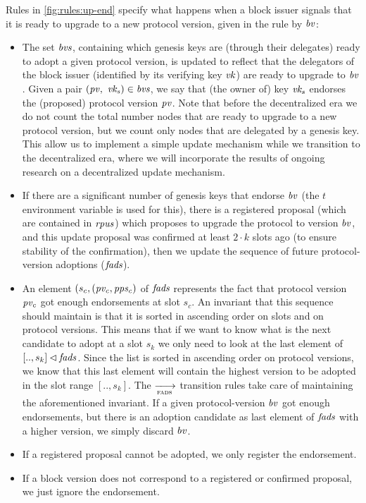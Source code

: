 Rules in \cref{fig:rules:up-end} specify what happens when a block issuer
signals that it is ready to upgrade to a new protocol version, given in the
rule by $\mathit{bv}$:
\begin{itemize}
\item The set $\mathit{bvs}$, containing which genesis keys are (through their
  delegates) ready to adopt a given protocol version, is updated to reflect
  that the delegators of the block issuer (identified by its verifying key
  $\mathit{vk}$) are ready to upgrade to $\mathit{bv}$. Given a pair
  $(\mathit{pv}, ~\mathit{vk_s}) \in \mathit{bvs}$, we say that (the owner of) key
  $\mathit{vk_s}$ endorses the (proposed) protocol version $\mathit{pv}$.
  Note that before the decentralized era we do not count the total number nodes
  that are ready to upgrade to a new protocol version, but we count only nodes
  that are delegated by a genesis key. This allow us to implement a simple
  update mechanism while we transition to the decentralized era, where we will
  incorporate the results of ongoing research on a decentralized update
  mechanism.
\item If there are a significant number of genesis keys that endorse $\mathit{bv}$
  (the $t$ environment variable is used for this), there is a registered
  proposal (which are contained in $\mathit{rpus}$) which proposes to upgrade the
  protocol to version $\mathit{bv}$, and this update proposal was confirmed at
  least $2 \cdot k$ slots ago (to ensure stability of the confirmation), then
  we update the sequence of future protocol-version adoptions ($\mathit{fads}$).
\item An element $(s_c, (\mathit{pv_c}, \mathit{pps_c})$ of $\mathit{fads}$ represents
  the fact that protocol version $\mathit{pv_c}$ got enough endorsements at slot
  $s_c$. An invariant that this sequence should maintain is that it is sorted
  in ascending order on slots and on protocol versions. This means that if we
  want to know what is the next candidate to adopt at a slot $s_k$ we only need
  to look at the last element of $[.., s_k] \lhd \mathit{fads}$. Since the
  list is sorted in ascending order on protocol versions, we know that this
  last element will contain the highest version to be adopted in the slot range
  $[.., s_k]$. The $\trans{fads}{}$ transition rules take care of maintaining
  the aforementioned invariant. If a given protocol-version $\mathit{bv}$ got
  enough endorsements, but there is an adoption candidate as last element of
  $\mathit{fads}$ with a higher version, we simply discard $\mathit{bv}$.
\item If a registered proposal cannot be adopted, we only register the
  endorsement.
\item If a block version does not correspond to a registered or confirmed
  proposal, we just ignore the endorsement.
\end{itemize}


